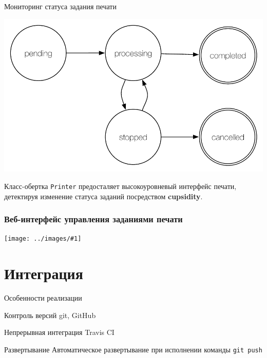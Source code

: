 \documentclass[utf-8]{beamer}
\newcommand{\slidegraphics}[1]{
\begin{center}
 \texttt{[image: ../images/\#1]}
\end{center}}
\begin{document}
\begin{frame}{Мониторинг статуса задания печати}
  \begin{center}
        \includegraphics[scale=0.5]{printer-class-simple.pdf}
  \end{center}
  Класс-обертка \texttt{Printer} предосталяет высокоуровневый интерфейс печати, детектируя изменение статуса заданий
  посредством \textbf{cupsidity}.
\end{frame}

\begin{frame}
  \frametitle{Веб-интерфейс управления заданиями печати}
  \slidegraphics{grid-interface-2.pdf}
\end{frame}


\section{Интеграция}
\begin{frame}{Особенности реализации}

  \begin{block}{Контроль версий}
    git, GitHub
  \end{block}

  \begin{block}{Непрерывная интеграция}
    Travis CI
  \end{block}


  \begin{block}{Развертывание}
    Автоматическое развертывание при исполнении команды \texttt{git push}
  \end{block}

\end{frame}
\end{document}
